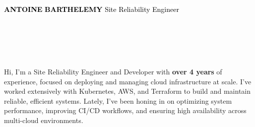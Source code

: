 \documentclass[10pt]{developercv}
\begin{document}
\hspace{-7pt}
\begin{minipage}[t]{0.50\textwidth}
	\vspace{-\baselineskip}
	\vspace{7pt}
	\colorbox{white}{{\HUGE\textcolor{black}{\textbf{\MakeUppercase{Antoine}}}}}
	\colorbox{white}{{\HUGE\textcolor{black}{\textbf{\MakeUppercase{Barthelemy}}}}}
	\colorbox{white}{\textcolor{black}{\huge{Site Reliability Engineer}}}
	\vspace{6pt}
\end{minipage}
\begin{minipage}[t]{0.28\textwidth}
	\vspace{-\baselineskip}
	\vspace{9pt}
	\\
	\\
	\\
	\\
\end{minipage}

\vspace{-10pt}


\hspace{0pt}\begin{minipage}[t]{1.00\textwidth}
	\vspace{-\baselineskip}
	{Hi, I’m a Site Reliability Engineer and Developer with \textbf{over 4 years} of experience, focused on deploying and managing cloud infrastructure at scale. I’ve worked extensively with Kubernetes, AWS, and Terraform to build and maintain reliable, efficient systems. Lately, I’ve been honing in on optimizing system performance, improving CI/CD workflows, and ensuring high availability across multi-cloud environments.}
\end{minipage}
\hfill

\end{document}
